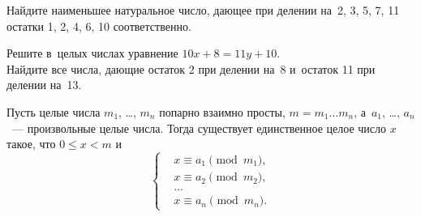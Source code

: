 


\begingroup
    \ifdefined\mathup
        \providecommand\eulerphi{\mathup{\mupphi}}%
    \fi
    \ifdefined\upphi
        \providecommand\eulerphi{\upphi}%
    \fi
    \providecommand\eulerphi{\phi}%

\begin{exercises}

\item
Найдите наименьшее натуральное число, дающее при делении на~2, 3, 5, 7, 11
остатки 1, 2, 4, 6, 10 соответственно.

\item\label{/algebra/number-theory/crt-wilson-theorem-g8/:exercise:2}
\subproblem
Решите в~целых числах уравнение $10 x + 8 = 11 y + 10$.
\\
\subproblem
Найдите все числа, дающие остаток 2 при делении на~8 и~остаток 11 при делении на~13.

\end{exercises}

Пусть целые числа $m_{1}$, \ldots, $m_{n}$ попарно взаимно просты,
$m = m_{1} \ldots m_{n}$, а~$a_{1}$, \ldots, $a_{n}$~--- произвольные целые
числа.
Тогда существует единственное целое число $x$ такое, что $0 \leq x < m$ и%
\[ \left\{ \begin{aligned} &
    x \equiv a_1 \pmod {m_1}
, \\ &
    x \equiv a_2 \pmod {m_2}
, \\ & \ldots \\ &
    x \equiv a_n \pmod {m_n}
. \end{aligned} \right. \]

